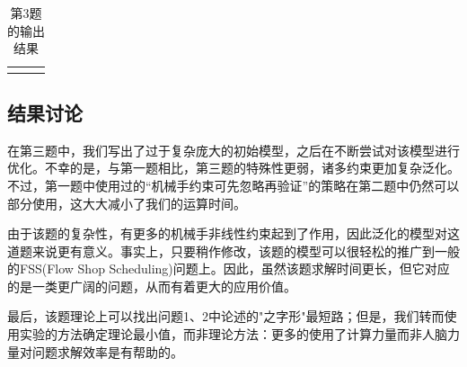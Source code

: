 \documentclass{ctexart}
\begin{document}
{{\begin{longtable}{clc}
        	
        	\bottomrule
        	
        	\caption{第3题的输出结果}
        \end{longtable}


    }

    \subsection{结果讨论}
    {
		在第三题中，我们写出了过于复杂庞大的初始模型，之后在不断尝试对该模型进行优化。不幸的是，与第一题相比，第三题的特殊性更弱，诸多约束更加复杂泛化。不过，第一题中使用过的“机械手约束可先忽略再验证”的策略在第二题中仍然可以部分使用，这大大减小了我们的运算时间。
		
		由于该题的复杂性，有更多的机械手非线性约束起到了作用，因此泛化的模型对这道题来说更有意义。事实上，只要稍作修改，该题的模型可以很轻松的推广到一般的FSS(Flow Shop Scheduling)问题上。因此，虽然该题求解时间更长，但它对应的是一类更广阔的问题，从而有着更大的应用价值。
		
		最后，该题理论上可以找出问题1、2中论述的"之字形"最短路；但是，我们转而使用实验的方法确定理论最小值，而非理论方法：更多的使用了计算力量而非人脑力量对问题求解效率是有帮助的。
    }
}
\end{document}
